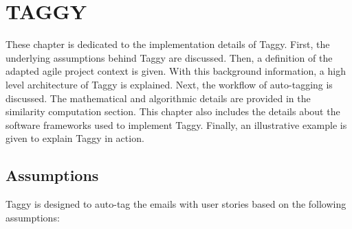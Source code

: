 \fancyhead[RO,LE]{\thepage}
\fancyfoot{} 
\chapter{TAGGY}
\label{ch:taggy}
These chapter is dedicated to the implementation details of Taggy. First, the underlying assumptions behind Taggy are discussed. Then, a definition of the adapted agile project context is given. With this background information, a high level architecture of Taggy is explained. Next, the workflow of auto-tagging is discussed. The mathematical and algorithmic details are provided in the similarity computation section. This chapter also includes the details about the software frameworks used to implement Taggy. Finally, an illustrative example is given to explain Taggy in action.

\section{Assumptions}
Taggy is designed to auto-tag the emails with user stories based on the following assumptions:

